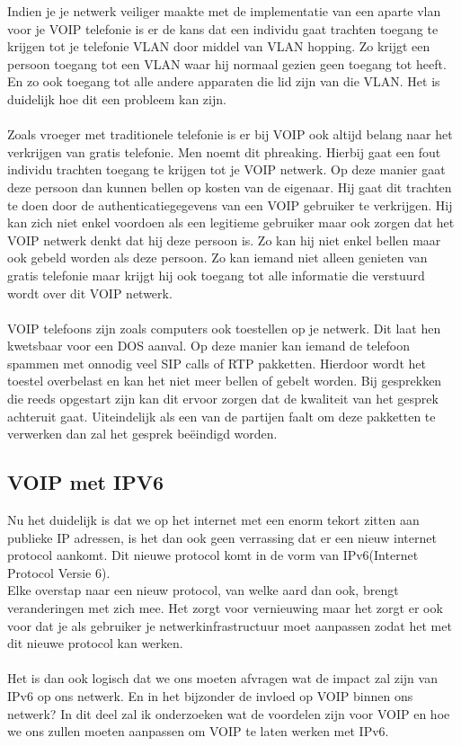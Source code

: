 \documentclass[pdftex,a4paper,12pt,twoside]{report}
\begin{document}
\newpage
Indien je je netwerk veiliger maakte met de implementatie van een aparte vlan voor je VOIP telefonie is er de kans dat een individu gaat trachten toegang te krijgen tot je telefonie VLAN door middel van VLAN hopping. Zo krijgt een persoon toegang tot een VLAN waar hij normaal gezien geen toegang tot heeft. En zo ook toegang tot alle andere apparaten die lid zijn van die VLAN.
Het is duidelijk hoe dit een probleem kan zijn.
\\ \\
Zoals vroeger met traditionele telefonie is er bij VOIP ook altijd belang naar het verkrijgen van gratis telefonie. Men noemt dit phreaking. Hierbij gaat een fout individu trachten toegang te krijgen tot je VOIP netwerk. Op deze manier gaat deze persoon dan kunnen bellen op kosten van de eigenaar. Hij gaat dit trachten te doen door de authenticatiegegevens van een VOIP gebruiker te verkrijgen. Hij kan zich niet enkel voordoen als een legitieme gebruiker maar ook zorgen dat het VOIP netwerk denkt dat hij deze persoon is. Zo kan hij niet enkel bellen maar ook gebeld worden als deze persoon. Zo kan iemand niet alleen genieten van gratis telefonie maar krijgt hij ook toegang tot alle informatie die verstuurd wordt over dit VOIP netwerk.
\\ \\
VOIP telefoons zijn zoals computers ook toestellen op je netwerk. Dit laat hen kwetsbaar voor een DOS aanval. Op deze manier kan iemand de telefoon spammen met onnodig veel SIP calls of RTP pakketten. Hierdoor wordt het toestel overbelast en kan het niet meer bellen of gebelt worden. Bij gesprekken die reeds opgestart zijn kan dit ervoor zorgen dat de kwaliteit van het gesprek achteruit gaat. Uiteindelijk als een van de partijen faalt om deze pakketten te verwerken dan zal het gesprek beëindigd worden.

\subsection{VOIP met IPV6}
	
 Nu het duidelijk is dat we op het internet met een enorm tekort zitten aan publieke IP adressen, is het dan ook geen verrassing dat er een nieuw internet protocol aankomt. Dit nieuwe protocol komt in de vorm van IPv6(Internet Protocol Versie 6). \\
Elke overstap naar een nieuw protocol, van welke aard dan ook, brengt veranderingen met zich mee. Het zorgt voor vernieuwing maar het zorgt er ook voor dat je als gebruiker je netwerkinfrastructuur moet aanpassen zodat het met dit nieuwe protocol kan werken. 
\\ \\
Het is dan ook logisch dat we ons moeten afvragen wat de impact zal zijn van IPv6 op ons netwerk. En in het bijzonder de invloed op VOIP binnen ons netwerk? In dit deel zal ik onderzoeken wat de voordelen zijn voor VOIP en hoe we ons zullen moeten aanpassen om VOIP te laten werken met IPv6.
\newpage
\end{document}

